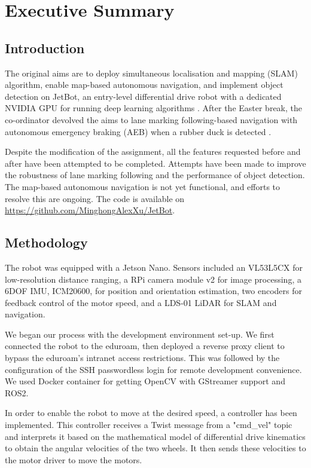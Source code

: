 \newpage
\section{Executive Summary}

\subsection{Introduction}

The original aims are to deploy simultaneous localisation and mapping (SLAM) algorithm, enable map-based autonomous navigation, and implement object detection on JetBot, an entry-level differential drive robot with a dedicated NVIDIA GPU for running deep learning algorithms \cite{ref:assignment-brief}. After the Easter break, the co-ordinator devolved the aims to lane marking following-based navigation with autonomous emergency braking (AEB) when a rubber duck is detected \cite{ref:assignment-brief}.

Despite the modification of the assignment, all the features requested before and after have been attempted to be completed. Attempts have been made to improve the robustness of lane marking following and the performance of object detection. The map-based autonomous navigation is not yet functional, and efforts to resolve this are ongoing. The code is available on \url{https://github.com/MinghongAlexXu/JetBot}.

\subsection{Methodology}

The robot was equipped with a Jetson Nano. Sensors included an VL53L5CX for low-resolution distance ranging, a RPi camera module v2 for image processing, a 6DOF IMU, ICM20600, for position and orientation estimation, two encoders for feedback control of the motor speed, and a LDS-01 LiDAR for SLAM and navigation.

We began our process with the development environment set-up. We first connected the robot to the eduroam, then deployed a reverse proxy client to bypass the eduroam's intranet access restrictions. This was followed by the configuration of the SSH passwordless login for remote development convenience. We used Docker container for getting OpenCV with GStreamer support and ROS2.

In order to enable the robot to move at the desired speed, a controller has been implemented. This controller receives a Twist message from a "cmd\_vel" topic and interprets it based on the mathematical model of differential drive kinematics to obtain the angular velocities of the two wheels. It then sends these velocities to the motor driver to move the motors.

